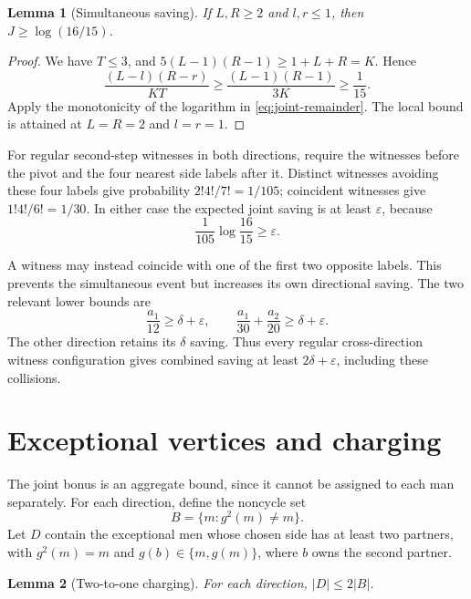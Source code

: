 \documentclass[11pt,letterpaper]{article}
\newtheorem{lemma}{Lemma}
\theoremstyle{remark}
\numberwithin{equation}{section}
\begin{document}
\begin{lemma}[Simultaneous saving]\label{lem:joint}
If \(L,R\ge2\) and \(l,r\le1\), then \(J\ge\log(16/15)\).
\end{lemma}

\begin{proof}
We have \(T\le3\), and
\(5(L-1)(R-1)\ge1+L+R=K\). Hence
\[
  \frac{(L-l)(R-r)}{KT}
  \ge\frac{(L-1)(R-1)}{3K}\ge\frac1{15}.
\]
Apply the monotonicity of the logarithm in \eqref{eq:joint-remainder}.
The local bound is attained at \(L=R=2\) and \(l=r=1\).
\end{proof}

For regular second-step witnesses in both directions, require the
witnesses before the pivot and the four nearest side labels after it.
Distinct witnesses avoiding these four labels give probability
\(2!4!/7!=1/105\); coincident witnesses give \(1!4!/6!=1/30\).
In either case the expected joint saving is at least \(\varepsilon\),
because
\begin{equation}\label{eq:epsilon}
  \frac{1}{105}\log\frac{16}{15}\ge\varepsilon.
\end{equation}

A witness may instead coincide with one of the first two opposite
labels. This prevents the simultaneous event but increases its own
directional saving. The two relevant lower bounds are
\begin{equation}\label{eq:cross-collision}
  \frac{a_1}{12}\ge\delta+\varepsilon,
  \qquad
  \frac{a_1}{30}+\frac{a_2}{20}\ge\delta+\varepsilon.
\end{equation}
The other direction retains its \(\delta\) saving. Thus every regular
cross-direction witness configuration gives combined saving at least
\(2\delta+\varepsilon\), including these collisions.

\section{Exceptional vertices and charging}
\label{sec:charging}

The joint bonus is an aggregate bound, since it cannot be assigned to
each man separately. For each direction, define the noncycle set
\[
  B=\{m:g^2(m)\ne m\}.
\]
Let \(D\) contain the exceptional men whose chosen side has at least
two partners, with \(g^2(m)=m\) and \(g(b)\in\{m,g(m)\}\), where
\(b\) owns the second partner.

\begin{lemma}[Two-to-one charging]\label{lem:charging}
For each direction, \(|D|\le2|B|\).
\end{lemma}
\end{document}
